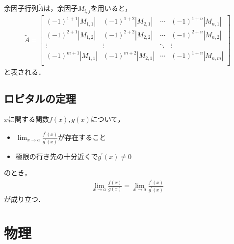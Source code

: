 \documentclass[11pt,a4paper]{jsarticle}
\begin{document}
余因子行列$\tilde{A}$は，余因子$M_{i,j}$を用いると，
\begin{align*}
  \tilde{A}=
  \begin{bmatrix}
    (-1)^{1+1}\left|M_{1,1}\right| & (-1)^{1+2}\left|M_{2,1}\right| & \cdots & (-1)^{1+n}\left|M_{n,1}\right| \\
    (-1)^{2+1}\left|M_{1,2}\right| & (-1)^{2+2}\left|M_{2,2}\right| & \cdots & (-1)^{2+n}\left|M_{n,2}\right| \\
    \vdots                         & \vdots                         & \ddots & \vdots                         \\
    (-1)^{m+1}\left|M_{1,1}\right| & (-1)^{m+2}\left|M_{2,1}\right| & \cdots & (-1)^{1+n}\left|M_{n,m}\right| \\
  \end{bmatrix}
\end{align*}
と表される．

\subsection{ロピタルの定理}

$x$に関する関数$f(x),g(x)$について，
\begin{itemize}
  \item $\lim_{x\to a}\frac{f^\prime(x)}{g^\prime(x)}$が存在すること
  \item 極限の行き先の十分近くで$g^\prime(x)\neq 0$
\end{itemize}
のとき，
\begin{align*}
  \lim_{x\to a}\frac{f(x)}{g(x)}=\lim_{x\to a}\frac{f^\prime(x)}{g^\prime(x)}
\end{align*}
が成り立つ．

\section{物理}

\end{document}
